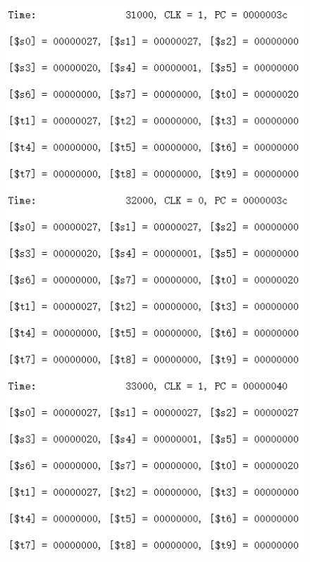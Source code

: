 \documentclass[12pt]{article}
\begin{document}
\begin{figure}[H]
\centering
\includegraphics[scale=1]{R11.jpg}
\end{figure}
\end{document}
